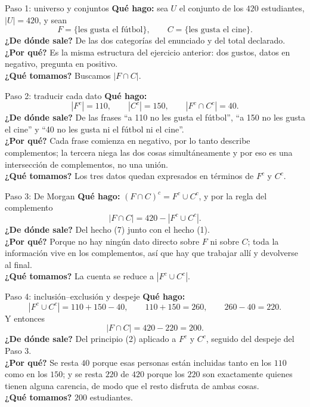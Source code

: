 \documentclass[11pt]{article}
\begin{document}
\begin{sol}

\begin{paso}{Paso 1: universo y conjuntos}
\textbf{Qu\'e hago:} sea $U$ el conjunto de los $420$ estudiantes, $|U|=420$, y sean
\[
F=\{\text{les gusta el f\'utbol}\},\qquad C=\{\text{les gusta el cine}\}.
\]
\textbf{¿De d\'onde sale?} De las dos categor\'ias del enunciado y del total declarado.\\
\textbf{¿Por qu\'e?} Es la misma estructura del ejercicio anterior: dos gustos, datos en negativo, pregunta en positivo.\\
\textbf{¿Qu\'e tomamos?} Buscamos $|F\cap C|$.
\end{paso}

\begin{paso}{Paso 2: traducir cada dato}
\textbf{Qu\'e hago:}
\[
|F^{c}| = 110,\qquad |C^{c}| = 150,\qquad |F^{c}\cap C^{c}| = 40 .
\]
\textbf{¿De d\'onde sale?} De las frases ``a 110 no les gusta el f\'utbol'', ``a 150 no les gusta el cine'' y ``40 no les gusta ni el f\'utbol ni el cine''.\\
\textbf{¿Por qu\'e?} Cada frase comienza en negativo, por lo tanto describe complementos; la tercera niega las dos cosas simult\'aneamente y por eso es una intersecci\'on de complementos, no una uni\'on.\\
\textbf{¿Qu\'e tomamos?} Los tres datos quedan expresados en t\'erminos de $F^{c}$ y $C^{c}$.
\end{paso}

\begin{paso}{Paso 3: De Morgan}
\textbf{Qu\'e hago:} $(F\cap C)^{c} = F^{c}\cup C^{c}$, y por la regla del complemento
\[
|F\cap C| = 420 - |F^{c}\cup C^{c}| .
\]
\textbf{¿De d\'onde sale?} Del hecho (7) junto con el hecho (1).\\
\textbf{¿Por qu\'e?} Porque no hay ning\'un dato directo sobre $F$ ni sobre $C$; toda la informaci\'on vive en los complementos, as\'i que hay que trabajar all\'i y devolverse al final.\\
\textbf{¿Qu\'e tomamos?} La cuenta se reduce a $|F^{c}\cup C^{c}|$.
\end{paso}

\begin{paso}{Paso 4: inclusi\'on--exclusi\'on y despeje}
\textbf{Qu\'e hago:}
\[
|F^{c}\cup C^{c}| = 110 + 150 - 40, \qquad 110 + 150 = 260, \qquad 260 - 40 = 220 .
\]
Y entonces
\[
|F\cap C| = 420 - 220 = 200 .
\]
\textbf{¿De d\'onde sale?} Del principio (2) aplicado a $F^{c}$ y $C^{c}$, seguido del despeje del Paso 3.\\
\textbf{¿Por qu\'e?} Se resta $40$ porque esas personas est\'an incluidas tanto en los $110$ como en los $150$; y se resta $220$ de $420$ porque los $220$ son exactamente quienes tienen alguna carencia, de modo que el resto disfruta de ambas cosas.\\
\textbf{¿Qu\'e tomamos?} $200$ estudiantes.
\end{paso}

\end{sol}
\end{document}
